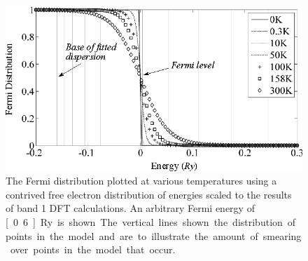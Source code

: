 \begin{figure}[htbp]
    \begin{center}
        \includegraphics[scale=0.9]{Chapter-dHvABaFe2P2/Figures/AngleDepMeasurements/SusceptibilityTempSmearing/SusceptibilityTempSmearing}
        \caption{The Fermi distribution plotted at various temperatures using a contrived free electron distribution of energies scaled to the results of band 1 DFT calculations. An arbitrary Fermi energy of \unit[0.6]{Ry} is shown. The vertical lines shown the distribution of points in the model and are to illustrate the amount of smearing over points in the model that occur.}
        \label{Fig:Exp:SusceptibilityTempSmearing}
    \end{center}
\end{figure}


